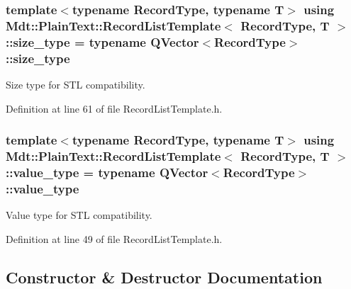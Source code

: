 \subsubsection[{\texorpdfstring{size\+\_\+type}{size_type}}]{\setlength{\rightskip}{0pt plus 5cm}template$<$typename Record\+Type, typename T$>$ using {\bf Mdt\+::\+Plain\+Text\+::\+Record\+List\+Template}$<$ Record\+Type, T $>$\+::{\bf size\+\_\+type} =  typename Q\+Vector$<$Record\+Type$>$\+::{\bf size\+\_\+type}}\hypertarget{class_mdt_1_1_plain_text_1_1_record_list_template_ac5b714fe2e3a5361f343ee1b9a49546b}{}\label{class_mdt_1_1_plain_text_1_1_record_list_template_ac5b714fe2e3a5361f343ee1b9a49546b}


Size type for S\+TL compatibility. 



Definition at line 61 of file Record\+List\+Template.\+h.

\subsubsection[{\texorpdfstring{value\+\_\+type}{value_type}}]{\setlength{\rightskip}{0pt plus 5cm}template$<$typename Record\+Type, typename T$>$ using {\bf Mdt\+::\+Plain\+Text\+::\+Record\+List\+Template}$<$ Record\+Type, T $>$\+::{\bf value\+\_\+type} =  typename Q\+Vector$<$Record\+Type$>$\+::{\bf value\+\_\+type}}\hypertarget{class_mdt_1_1_plain_text_1_1_record_list_template_a15ca07bf051f835ce544901a06639990}{}\label{class_mdt_1_1_plain_text_1_1_record_list_template_a15ca07bf051f835ce544901a06639990}


Value type for S\+TL compatibility. 



Definition at line 49 of file Record\+List\+Template.\+h.



\subsection{Constructor \& Destructor Documentation}
